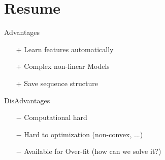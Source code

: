 \documentclass{beamer}
\begin{document}
	\section*{Resume}
	\begin{frame}
		Advantages
		\begin{itemize}
			\item[+] Learn features automatically 
			\item[+] Complex non-linear Models
			\item[+] Save sequence structure
		\end{itemize}
		
		\vspace{1cm}
		DisAdvantages
		\begin{itemize}
			\item[$-$] Computational hard
			\item[$-$] Hard to optimization (non-convex, ...)
			\item[$-$] Available for Over-fit (how can we solve it?)
		\end{itemize}
		
	\end{frame}
\end{document}
